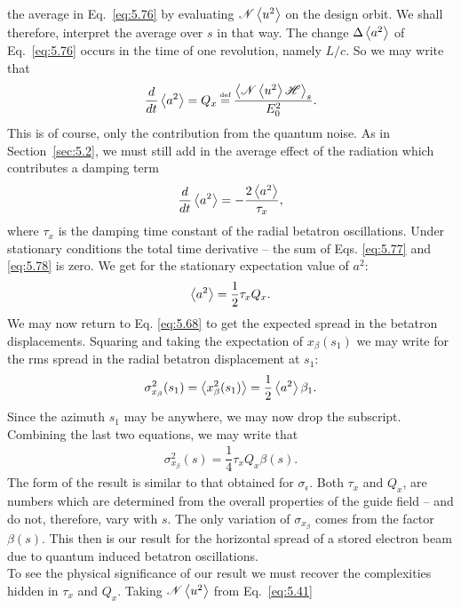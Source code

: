 \documentclass[../sands-adaptation.tex]{subfiles}
\begin{document}
 the average in Eq.~\eqref{eq:5.76} by evaluating $\mathscr{N}\left< u^2 \right>$ on the design orbit. We shall therefore, interpret the average over $s$ in that way.
The change $\Delta \left< a^2 \right>$ of Eq.~\eqref{eq:5.76} occurs in the time of one revolution, namely $L/c$. So we may write that
\begin{align} \label{eq:5.77}
	\dfrac{d}{dt} \mean{a^2} = Q_x \bydef \dfrac{\mean{\mathscr{N}\mean{u^2}\mathscr{H}}_s}{E_0^2}.
\end{align}
This is of course, only the contribution from the quantum noise. As in Section~\ref{sec:5.2}, we must still add in the average effect of the radiation which contributes a damping term
\begin{align} \label{eq:5.78}
	\dfrac{d}{dt} \left< a^2 \right> = - \dfrac{2 \left< a^2 \right>}{\tau_x},
\end{align}
where $\tau_x$ is the damping time constant of the radial betatron oscillations. Under stationary
 conditions the total time derivative -- the sum of Eqs. \eqref{eq:5.77} and \eqref{eq:5.78} is zero. We get for the stationary expectation value of $a^2$:
\begin{align}
	\left< a^2 \right> = \dfrac{1}{2} \tau_x Q_x.
\end{align}
We may now return to Eq. \eqref{eq:5.68} to get the expected spread in the betatron displacements. Squaring and taking the expectation of $x_\beta(s_1)$ we may write for the rms spread in the radial betatron displacement at $s_1$:
\begin{align} \label{eq:5.81}
	\sigma_{x_\beta}^2(s_1) = \left< x_\beta^2(s_1) \right> = \dfrac{1}{2}\left< a^2 \right>\beta_1.
\end{align}
Since the azimuth $s_1$ may be anywhere, we may now drop the subscript. Combining the last two equations, we may write that
\begin{align}
	\sigma_{x_\beta}^2(s) = \dfrac{1}{4} \tau_x Q_x \beta(s).
\end{align}
The form of the result is similar to that obtained for $\sigma_\epsilon$. Both $\tau_x$ and $Q_x$, are numbers which are determined from the overall properties of the guide field -- and do not, therefore, vary with $s$. The only variation of $\sigma_{x_\beta}$ comes from the factor $\beta(s)$. This then is our result for the horizontal spread of a stored electron beam due to quantum induced betatron oscillations.\\
To see the physical significance of our result we must recover the complexities hidden in $\tau_x$ and $Q_x$. Taking $\mathscr{N}\left< u^2 \right>$ from Eq.~\eqref{eq:5.41}
\end{document}
